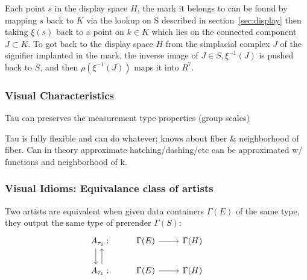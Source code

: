 \documentclass[../main.tex]{subfiles}
\begin{document}
Each point $s$ in the display space $H$, the mark it belongs to can be found by mapping $s$ back to $K$ via the lookup on S described in section~\ref{sec:display} then taking $\xi(s)$ back to a point on $k \in K$ which lies on the connected component $J \subset K$. To got back to the display space $H$  from the simplacial complex $J$ of the signifier implanted in the mark, the inverse image of $J \in S, \xi^{-1}(J)$ is pushed back to $S$, and then  $\rho(\xi^{-1}(J))$ maps it into $R^{7}$. 



\subsubsection{Visual Characteristics}
Tau can preserves the measurement type properties (group scales)


Tau is fully flexible and can do whatever; knows about fiber \& neighborhood of fiber. Can in theory approximate hatching/dashing/etc can be approximated w/ functions and neighborhood of k. 
\subsubsection{Visual Idioms: Equivalance class of artists}
Two artists are equivalent when given data containers $\Gamma(E)$ of the same type, they output the same type of prerender $\Gamma(S)$:
\begin{equation}
    \begin{tikzcd}
        A_{\tau_2}: \arrow[d, shift right=2] & \Gamma(E) \arrow[r] & \Gamma(H) &                                                \\
        A_{\tau_1}: \arrow[u, shift right]   & \Gamma(E) \arrow[r] & \Gamma(H) 
    \end{tikzcd}
\end{equation}
\end{document}
